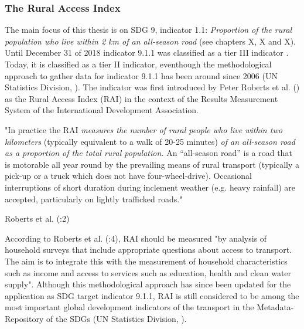 	            \medskip
	            
	            
	            

	       \subsubsection{The Rural Access Index}
	            
	            The main focus of this thesis is on SDG 9, indicator 1.1: \textit{Proportion of the rural population who live within 2 km of an all-season road} (see chapters X, X and X). Until December 31 of 2018 indicator 9.1.1 was classified as a tier III indicator \citep{sdsn2015}. Today, it is classified as a tier II indicator, eventhough the methodological approach to gather data for indicator 9.1.1 has been around since 2006 (UN Statistics Division, \citeyear{unitednationsstatisticsdivision2019b}). The indicator was first introduced by Peter Roberts et al. (\citeyear{roberts2006}) as the Rural Access Index (RAI) in the context of the Results Measurement System of the International Development Association. 
	            
	            \medskip
	            
	             \begin{tcolorbox}
    				
    				"In practice the RAI \textit{measures the number of rural people who live within two kilometers} (typically equivalent to a walk of 20-25 minutes) \textit{of an all-season road as a proportion of the total rural population.} An “all-season road” is a road that is motorable all year round by the prevailing means of rural transport (typically a pick-up or a truck which does not have four-wheel-drive). Occasional interruptions of short duration during inclement weather (e.g. heavy rainfall) are accepted, particularly on lightly trafficked roads."
    				
    				\begin{center}
    				    Roberts et al. (\citeyear{roberts2006}:2)
    				\end{center}
			    \end{tcolorbox}

	            \medskip
                
                According to Roberts et al. (\citeyear{roberts2006}:4), RAI should be measured "by analysis of household surveys that include appropriate questions about access to transport. The aim is to integrate this with the measurement of household characteristics such as income and access to services such as education, health and clean water supply". Although this methodological approach has since been updated for the application as SDG target indicator 9.1.1, RAI is still considered to be among the most important global development indicators of the transport in the Metadata-Repository of the SDGs (UN Statistics Division, \citeyear{unitednationsstatisticsdivision2019a}). 
                
